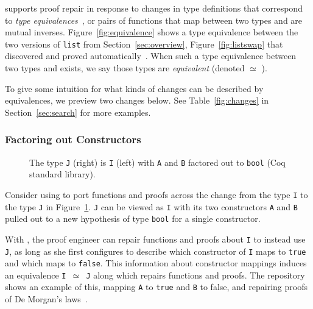 \toolname supports proof repair in response to changes in type definitions
that correspond to \textit{type equivalences}~\cite{univalent2013homotopy},
or pairs of functions that map between two types and are mutual inverses.
Figure~\ref{fig:equivalence} shows a type equivalence between the two versions of \lstinline{list}
from Section~\ref{sec:overview}, Figure~\ref{fig:listswap} that \toolname discovered and proved automatically~.
When such a type equivalence between two types \A and \B exists, we say those types are \textit{equivalent} (denoted \A $\simeq$ \B). %
%

To give some intuition for what kinds of changes can be described by equivalences, we preview two changes below.
See Table~\ref{fig:changes} in Section~\ref{sec:search} for more examples.

\subsubsection*{Factoring out Constructors}
\label{sec:ex1}

\begin{figure}
\begin{minipage}{0.48\columnwidth}

\end{minipage}
\hfill
\begin{minipage}{0.48\columnwidth}

\end{minipage}
\vspace{-0.3cm}
\caption{The type \lstinline{J} (right) is \lstinline{I} (left) with \lstinline{A} and \lstinline{B} factored out to \lstinline{bool} (Coq standard library).}
\label{fig:equivalence2}
\end{figure}

Consider using \toolname to port functions and proofs across the change from the type \lstinline{I} to the type \lstinline{J} 
in Figure~\ref{fig:equivalence2}.
\lstinline{J} can be viewed as \lstinline{I} with its two constructors \lstinline{A} and \lstinline{B} pulled out to a
new hypothesis of type \lstinline{bool} for a single constructor.

With \toolname, the proof engineer can repair functions and proofs about \lstinline{I} to instead use \lstinline{J},
as long as she first configures \toolname to describe which constructor 
of \lstinline{I} maps to \lstinline{true} and which maps to \lstinline{false}.
This information about constructor mappings induces an equivalence \lstinline{I }$\simeq$\lstinline{ J}
along which \toolname repairs functions and proofs.
The repository shows an example of this, mapping \lstinline{A} to \lstinline{true} and \lstinline{B} to false,
and repairing proofs of De Morgan's laws~. %
%

